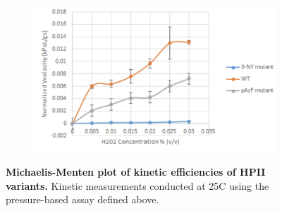 \documentclass[9pt,twocolumn,twoside]{pnas-new}
\begin{document}
\begin{figure}[h!]
  \centering
  \begin{subfigure}{\textwidth}
    \begin{minipage}{0.1\textwidth}\caption{}\end{minipage}%
    \begin{minipage}{0.9\textwidth}\includegraphics[width=0.9\linewidth]{figures/kinetics.png}\end{minipage}
  \end{subfigure}
  \caption{\textbf{Michaelis-Menten plot of kinetic efficiencies of HPII variants.} Kinetic measurements conducted at 25C using the pressure-based assay defined above.}
\label{fig:kinetics}
\end{figure}
\end{document}

